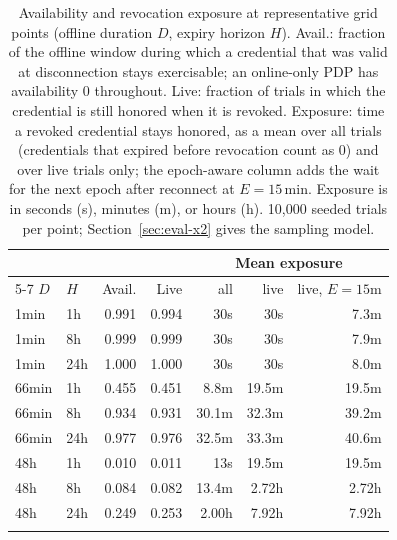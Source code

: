 \begin{table}[htbp]
\centering
\caption{Availability and revocation exposure at representative grid points (offline duration $D$, expiry horizon $H$). Avail.: fraction of the offline window during which a credential that was valid at disconnection stays exercisable; an online-only PDP has availability $0$ throughout. Live: fraction of trials in which the credential is still honored when it is revoked. Exposure: time a revoked credential stays honored, as a mean over all trials (credentials that expired before revocation count as $0$) and over live trials only; the epoch-aware column adds the wait for the next epoch after reconnect at $E{=}15$\,min. Exposure is in seconds (s), minutes (m), or hours (h). 10{,}000 seeded trials per point; Section~\ref{sec:eval-x2} gives the sampling model.}
\label{tab:x2-avail}
\begin{tabular}{ll r r rr r}
\toprule
 & & & & \multicolumn{3}{c}{Mean exposure} \\
\cmidrule(lr){5-7}
$D$ & $H$ & Avail. & Live & all & live & live, $E{=}15$m \\
\midrule
1min & 1h & 0.991 & 0.994 & 30s & 30s & 7.3m \\
1min & 8h & 0.999 & 0.999 & 30s & 30s & 7.9m \\
1min & 24h & 1.000 & 1.000 & 30s & 30s & 8.0m \\
\addlinespace
66min & 1h & 0.455 & 0.451 & 8.8m & 19.5m & 19.5m \\
66min & 8h & 0.934 & 0.931 & 30.1m & 32.3m & 39.2m \\
66min & 24h & 0.977 & 0.976 & 32.5m & 33.3m & 40.6m \\
\addlinespace
48h & 1h & 0.010 & 0.011 & 13s & 19.5m & 19.5m \\
48h & 8h & 0.084 & 0.082 & 13.4m & 2.72h & 2.72h \\
48h & 24h & 0.249 & 0.253 & 2.00h & 7.92h & 7.92h \\
\addlinespace
\bottomrule
\end{tabular}
\end{table}

